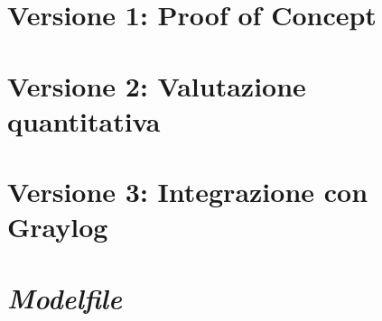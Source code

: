 \documentclass[12pt,twoside]{report}
\begin{document}
\section{Versione 1: Proof of Concept}






\clearpage

\section{Versione 2: Valutazione quantitativa}





\section{Versione 3: Integrazione con Graylog}



\clearpage

\section{\textit{Modelfile}}
\label{sec:code_modelfile}


\end{document}
